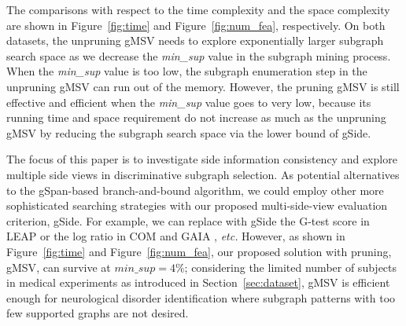 \documentclass[conference]{IEEEtran}
\newcommand{\gscore}[0]{gSide}
\newcommand{\galgo}[0]{gMSV}
\begin{document}
The comparisons with respect to the time complexity and the space complexity are shown in Figure~\ref{fig:time} and Figure~\ref{fig:num_fea}, respectively. On both datasets, the unpruning {\galgo} needs to explore exponentially larger subgraph search space as we decrease the \emph{min\_sup} value in the subgraph mining process. When the \emph{min\_sup} value is too low, the subgraph enumeration step in the unpruning {\galgo} can run out of the memory. However, the pruning {\galgo} is still effective and efficient when the \emph{min\_sup} value goes to very low, because its running time and space requirement do not increase as much as the unpruning {\galgo} by reducing the subgraph search space via the lower bound of {\gscore}.

The focus of this paper is to investigate side information consistency and explore multiple side views in discriminative subgraph selection. As potential alternatives to the gSpan-based branch-and-bound algorithm, we could employ other more sophisticated searching strategies with our proposed multi-side-view evaluation criterion, {\gscore}. For example, we can replace with {\gscore} the G-test score in LEAP \cite{yan2008mining} or the log ratio in COM \cite{jin2009graph} and GAIA \cite{jin2010gaia}, \emph{etc.} However, as shown in Figure~\ref{fig:time} and Figure~\ref{fig:num_fea}, our proposed solution with pruning, {\galgo}, can survive at $min\_sup=4\%$; considering the limited number of subjects in medical experiments as introduced in Section~\ref{sec:dataset}, {\galgo} is efficient enough for neurological disorder identification where subgraph patterns with too few supported graphs are not desired.
\end{document}
